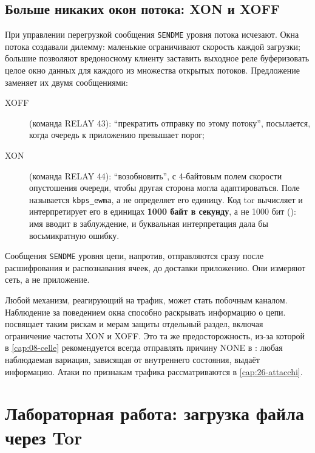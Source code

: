\subsection{Больше никаких окон потока: XON и XOFF}

При управлении перегрузкой сообщения \texttt{SENDME} уровня потока исчезают. Окна потока создавали дилемму: маленькие ограничивают скорость каждой загрузки; большие позволяют вредоносному клиенту заставить выходное реле буферизовать целое окно данных для каждого из множества открытых потоков. Предложение заменяет их двумя сообщениями:
\begin{description}
  \item[XOFF] (команда RELAY 43): \enquote{прекратить отправку по этому потоку}, посылается, когда очередь к приложению превышает порог;
  \item[XON] (команда RELAY 44): \enquote{возобновить}, с 4-байтовым полем скорости опустошения очереди, чтобы другая сторона могла адаптироваться. Поле называется \texttt{kbps\_ewma}, а  не определяет его единицу. Код tor вычисляет и интерпретирует его в единицах \textbf{1000 байт в секунду}, а не 1000 бит (): имя вводит в заблуждение, и буквальная интерпретация дала бы восьмикратную ошибку.
\end{description}
Сообщения \texttt{SENDME} уровня цепи, напротив, отправляются сразу после расшифрования и распознавания ячеек, до доставки приложению. Они измеряют сеть, а не приложение.

\begin{attenzione}
Любой механизм, реагирующий на трафик, может стать побочным каналом. Наблюдение за поведением окна способно раскрывать информацию о цепи.  посвящает таким рискам и мерам защиты отдельный раздел, включая ограничение частоты XON и XOFF. Это та же предосторожность, из-за которой в \cref{cap:08-celle} рекомендуется всегда отправлять причину NONE в : любая наблюдаемая вариация, зависящая от внутреннего состояния, выдаёт информацию. Атаки по признакам трафика рассматриваются в \cref{cap:26-attacchi}.
\end{attenzione}

\section{Лабораторная работа: загрузка файла через Tor}\label{sec:lab-stream}

